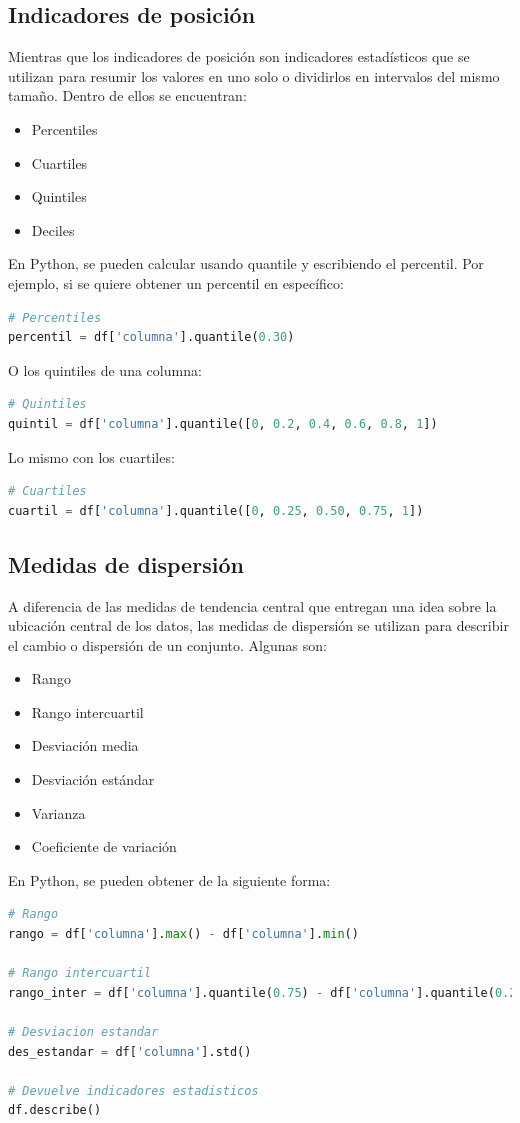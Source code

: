\documentclass[a4paper, 12pt]{book}
\begin{document}
\subsection{Indicadores de posición}
Mientras que los indicadores de posición son indicadores estadísticos que se utilizan para resumir los valores en uno solo o dividirlos en intervalos del mismo tamaño. Dentro de ellos se encuentran:
\begin{itemize}
	\item Percentiles
	\item Cuartiles
	\item Quintiles
	\item Deciles
\end{itemize}
En Python, se pueden calcular usando quantile y escribiendo el percentil. Por ejemplo, si se quiere obtener un percentil en específico:
\begin{lstlisting}[language=Python]
# Percentiles
percentil = df['columna'].quantile(0.30)
\end{lstlisting}
O los quintiles de una columna:
\begin{lstlisting}[language=Python]
# Quintiles
quintil = df['columna'].quantile([0, 0.2, 0.4, 0.6, 0.8, 1])
\end{lstlisting}
Lo mismo con los cuartiles:
\begin{lstlisting}[language=Python]
# Cuartiles
cuartil = df['columna'].quantile([0, 0.25, 0.50, 0.75, 1])
\end{lstlisting}
\subsection{Medidas de dispersión}
A diferencia de las medidas de tendencia central que entregan una idea sobre la ubicación central de los datos, las medidas de dispersión se utilizan para describir el cambio o dispersión de un conjunto. Algunas son:
\begin{itemize}
	\item Rango
 	\item Rango intercuartil
 	\item Desviación media
 	\item Desviación estándar
 	\item Varianza
 	\item Coeficiente de variación
\end{itemize}
En Python, se pueden obtener de la siguiente forma:
\begin{lstlisting}[language=Python]
# Rango
rango = df['columna'].max() - df['columna'].min()
	
# Rango intercuartil
rango_inter = df['columna'].quantile(0.75) - df['columna'].quantile(0.25)

# Desviacion estandar
des_estandar = df['columna'].std()

# Devuelve indicadores estadisticos
df.describe()
\end{lstlisting}
\end{document}
